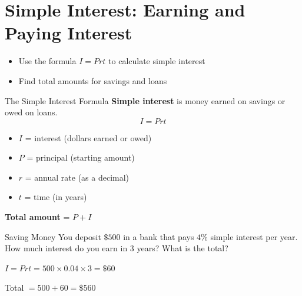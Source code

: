 \section{Simple Interest: Earning and Paying Interest}

\begin{learningGoals}
\begin{itemize}
    \item Use the formula $I = Prt$ to calculate simple interest
    \item Find total amounts for savings and loans
\end{itemize}
\end{learningGoals}

\begin{conceptBox}{The Simple Interest Formula}
\textbf{Simple interest} is money earned on savings or owed on loans.
$$I = Prt$$
\begin{itemize}[leftmargin=*]
    \item $I$ = interest (dollars earned or owed)
    \item $P$ = principal (starting amount)
    \item $r$ = annual rate (as a decimal)
    \item $t$ = time (in years)
\end{itemize}
\textbf{Total amount} = $P + I$
\end{conceptBox}

\begin{workedExample}{Saving Money}
You deposit $\$500$ in a bank that pays $4\%$ simple interest per year. How much interest do you earn in $3$ years? What is the total?

$I = Prt = 500 \times 0.04 \times 3 = \$60$

Total $= 500 + 60 = \$560$
\end{workedExample}


